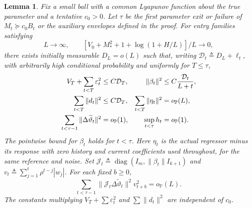 \documentclass[11pt,reqno]{amsart}
\numberwithin{equation}{section}
\newtheorem{lemma}[theorem]{Lemma}
\theoremstyle{definition}
\theoremstyle{remark}
\newcommand{\Prob}{\mathbb P}
\newcommand{\etac}{\widetilde{\vartheta}}
\newcommand{\diag}{\operatorname{diag}}
\begin{document}
\begin{lemma}\label{lem:localenergy}
Fix a small ball with a common Lyapunov function about the true parameter and a tentative $c_0>0$. Let $\tau$ be the first parameter exit or failure of $M_t\succeq c_0B_t$ or the auxiliary envelopes defined in the proof. For entry families satisfying
\begin{equation*}
 L\to\infty,\qquad [V_0+M_*^2+1+\log(1+H/L)]/L\to0,
\end{equation*}
there exists initially measurable $D_L=o(L)$ such that, writing $\mathcal D_t\triangleq D_L+\ell_t$, with arbitrarily high conditional probability and uniformly for $T\le\tau$,
\begin{align}
 V_T+\sum_{t<T}\varepsilon_t^2&\le C\mathcal D_T,&
 \|\beta_t\|^2&\le C\frac{\mathcal D_t}{L+t},\label{eq:stopped1}\\
 \sum_{t<T}\|d_t\|^2&\le C\mathcal D_T,&
 \sum_{t<T}\|\eta_t\|^2&=o_{\Prob}(L),\label{eq:stopped2}\\
 \sum_{t<\tau-1}\|\Delta\etac_t\|^2&=o_{\Prob}(1),&
 \sup_{t<\tau}h_t&=o_{\Prob}(1).\notag
\end{align}
The pointwise bound for $\beta_t$ holds for $t<\tau$. Here $\eta_t$ is the actual regressor minus its response with zero history and current coefficients used throughout, for the same reference and noise. Set $\mathcal J_t\triangleq\diag(I_m,\|\beta_t\|I_{k+1})$ and $v_t\triangleq\sum_{j=1}^t\rho^{t-j}|w_j|$. For each fixed $b\ge0$,
\begin{equation*}
 \sum_{t<\tau-1}\|\mathcal J_t\Delta\etac_t\|^2v_{t+b}^2=o_{\Prob}(L).
\end{equation*}
The constants multiplying $V_T+\sum\varepsilon_t^2$ and $\sum\|d_t\|^2$ are independent of $c_0$.
\end{lemma}
\end{document}
